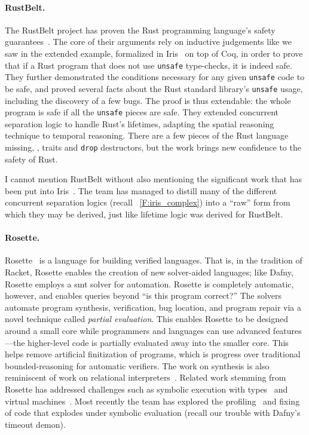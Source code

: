 \paragraph{RustBelt.} The RustBelt project has proven the Rust programming
language's safety guarantees~\cite{Jung_2018a,Jung_2021}. The core of their
arguments rely on inductive judgements like we saw in the extended example,
formalized in Iris~\cite{Jung_2018b} on top of Coq, in order to prove that if a
Rust program that does not use \texttt{unsafe} type-checks, it is indeed safe.
They further demonstrated the conditions necessary for any given \texttt{unsafe}
code to be safe, and proved several facts about the Rust standard library's
\texttt{unsafe} usage, including the discovery of a few bugs. The proof is thus
extendable: the whole program is safe if all the \texttt{unsafe} pieces are
safe. They extended concurrent separation logic to handle Rust's lifetimes,
adapting the spatial reasoning technique to temporal reasoning. There are a few
pieces of the Rust language missing, \eg, traits and \texttt{drop} destructors,
but the work brings new confidence to the safety of Rust.

I cannot mention RustBelt without also mentioning the significant work that has
been put into Iris~\cite{Jung_2015,Jung_2016,Krebbers_2017a,Jung_2018b}. The
team has managed to distill many of the different concurrent separation logics
(recall \figurename~\ref{F:iris_complex}) into a ``raw'' form from which they
may be derived, just like lifetime logic was derived for RustBelt.

\paragraph{Rosette.} Rosette~\cite{Rosette,Torlak_2013} is a language for
building verified languages. That is, in the tradition of Racket, Rosette
enables the creation of new solver-aided languages; like Dafny, Rosette employs
a \gls{smt} solver for automation. Rosette is completely automatic, however, and
enables queries beyond ``is this program correct?'' The solvers automate
program synthesis, verification, bug location, and program repair via a novel
technique called \emph{partial evaluation}. This enables Rosette to be designed
around a small core while programmers and languages can use advanced
features---the higher-level code is partially evaluated away into the smaller
core. This helps remove artificial finitization of programs, which is progress
over traditional bounded-reasoning for automatic verifiers. The work on
synthesis is also reminiscent of work on relational
interpreters~\cite{Byrd_2012}. Related work stemming from Rosette has addressed
challenges such as symbolic execution with types~\cite{Chang_2018} and virtual
machines~\cite{Torlak_2014}. Most recently the team has explored the
profiling~\cite{Bornholt_2018} and fixing~\cite{Porncharoenwase_2020} of code
that explodes under symbolic evaluation (recall our trouble with Dafny's timeout
demon).

